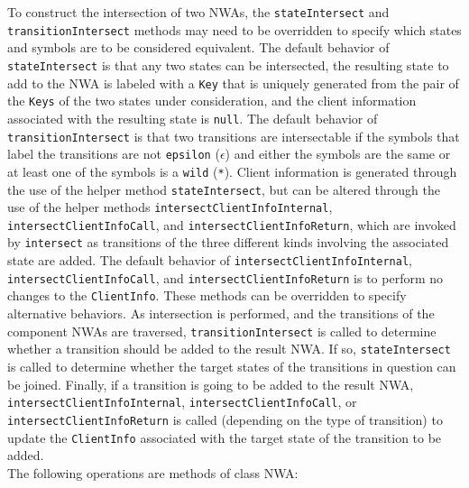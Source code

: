 \documentclass{llncs}
\begin{document}
To construct the intersection of two NWAs, the \texttt{stateIntersect} and \texttt{transitionIntersect} methods may need to be overridden to specify which states and symbols are to be considered equivalent.  The default behavior of \texttt{stateIntersect} is that any two states can be intersected, the resulting state to add to the NWA is labeled with a \texttt{Key} that is uniquely generated from the pair of the \texttt{Keys} of the two states under consideration, and the client information associated with the resulting state is \texttt{null}.  The default behavior of \texttt{transitionIntersect} is that two transitions are intersectable if the symbols that label the transitions are not \texttt{epsilon} (\texttt{$\epsilon$}) and either the symbols are the same or at least one of the symbols is a \texttt{wild} (\texttt{*}). Client information is generated through the use of the helper method \texttt{stateIntersect}, but can be altered through the use of the helper methods \texttt{intersectClientInfoInternal}, \texttt{intersectClientInfoCall}, and  \texttt{intersectClientInfoReturn}, which are invoked by \texttt{intersect} as transitions of the three different kinds involving the associated state are added.  The default behavior of \texttt{intersectClientInfoInternal}, \texttt{intersectClientInfoCall}, and \texttt{intersectClientInfoReturn} is to perform no changes to the \texttt{ClientInfo}.  These methods can be overridden to specify alternative behaviors. As intersection is performed, and the transitions of the component NWAs are traversed, \texttt{transitionIntersect} is called to determine whether a transition should be added to the result NWA.  If so, \texttt{stateIntersect} is called to determine whether the target states of the transitions in question can be joined.  Finally, if a transition is going to be added to the result NWA, \texttt{intersectClientInfoInternal}, \texttt{intersectClientInfoCall}, or \texttt{intersectClientInfoReturn} is called (depending on the type of transition) to update the \texttt{ClientInfo} associated with the target state of the transition to be added. \\

\noindent The following operations are methods of class NWA:
\end{document}

